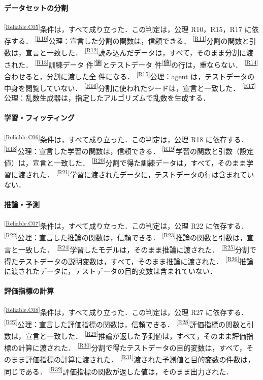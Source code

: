 \documentclass[9pt,a4paper,twocolumn]{ltjsarticle}
\newcommand{\repositoryurl}{https://github.com/auto-res2/formal-first-diabetes-regression-5}
\newcommand{\schemaurl}{\repositoryurl/blob/\SchemaCommit/formal/claims.json}
\newcommand{\cid}[1]{\textsuperscript{\textsf{\scriptsize[\href{\schemaurl\#L\csname line#1\endcsname}{#1}]}}}
\newcommand{\val}[1]{\textsuperscript{\textsf{\scriptsize[\href{\schemaurl\#L\csname line#1\endcsname}{値}]}}}
\begin{document}
\paragraph{データセットの分割}
\cid{Reliable.C05}条件は，すべて成り立った．この判定は，公理 R10，R15，R17 に依存する．
\cid{R10}公理：宣言した分割の関数は，信頼できる．
\cid{R11}分割の関数と引数は，宣言と一致した．
\cid{R12}読み込んだデータは，すべて，そのまま分割に渡された．
\cid{R13}訓練データ \NTrain{} 件\val{observedTrainIndex}とテストデータ \NTest{} 件\val{observedTestIndex}の行は，重ならない．
\cid{R14}合わせると，分割に渡した全 \NSamples{} 件になる．
\cid{R15}公理：agent は，テストデータの中身を閲覧していない．
\cid{R16}分割に使われたシードは，宣言と一致した．
\cid{R17}公理：乱数生成器は，指定したアルゴリズムで乱数を生成する．

\paragraph{学習・フィッティング}
\cid{Reliable.C06}条件は，すべて成り立った．この判定は，公理 R18 に依存する．
\cid{R18}公理：宣言した学習の関数は，信頼できる．
\cid{R19}学習の関数と引数（設定値）は，宣言と一致した．
\cid{R20}分割で得た訓練データは，すべて，そのまま学習に渡された．
\cid{R21}学習に渡されたデータに，テストデータの行は含まれていない．

\paragraph{推論・予測}
\cid{Reliable.C07}条件は，すべて成り立った．この判定は，公理 R22 に依存する．
\cid{R22}公理：宣言した推論の関数は，信頼できる．
\cid{R23}推論の関数と引数は，宣言と一致した．
\cid{R24}学習したモデルは，そのまま推論に渡された．
\cid{R25}分割で得たテストデータの説明変数は，すべて，そのまま推論に渡された．
\cid{R26}推論に渡されたデータに，テストデータの目的変数は含まれていない．

\paragraph{評価指標の計算}
\cid{Reliable.C08}条件は，すべて成り立った．この判定は，公理 R27 に依存する．
\cid{R27}公理：宣言した評価指標の関数は，信頼できる．
\cid{R28}評価指標の関数と引数は，宣言と一致した．
\cid{R29}推論が返した予測値は，すべて，そのまま評価指標の計算に渡された．
\cid{R30}分割で得たテストデータの目的変数は，すべて，そのまま評価指標の計算に渡された．
\cid{R31}渡された予測値と目的変数の件数は，同じである．
\cid{R32}評価指標の関数が返した値は，そのまま出力された．
\end{document}
